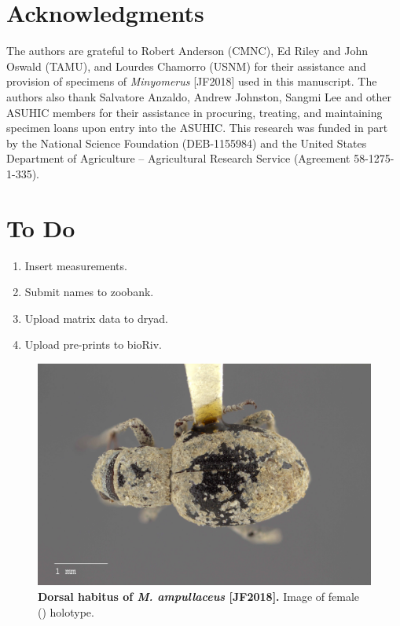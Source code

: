 \documentclass[fleqn,10pt,lineno]{wlpeerj} %
\begin{document}
		
\section*{Acknowledgments}
	The authors are grateful to Robert Anderson (CMNC), Ed Riley and John Oswald (TAMU), and Lourdes Chamorro (USNM) for their assistance and provision of specimens of \textit{Minyomerus} [JF2018] used in this manuscript.
	The authors also thank Salvatore Anzaldo, Andrew Johnston, Sangmi Lee and other ASUHIC members for their assistance in procuring, treating, and maintaining specimen loans upon entry into the ASUHIC.
	This research was funded in part by the National Science Foundation (DEB-1155984) and the United States Department of Agriculture – Agricultural Research Service (Agreement 58-1275-1-335).


\section*{To Do}
	\begin{enumerate}[itemsep=-0.4em]
		\item Insert measurements.
		\item Submit names to zoobank.
		\item Upload matrix data to dryad.
		\item Upload pre-prints to bioR{\textchi}iv.
	\end{enumerate}

\newpage
 

\newpage

\begin{figure}[h]
	\begin{sideways}
		\centering
		\includegraphics[height=\textwidth]{ampullaceus_F_dorsal.jpg}
	\end{sideways}
	\caption{\textbf{Dorsal habitus of \textit{M. ampullaceus} [JF2018].} Image of female (\female) holotype.}
	\label{fig:ampullaceus_F_dorsal}
\end{figure}
\end{document}
